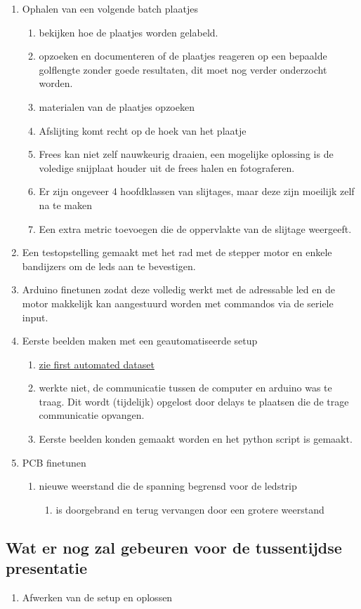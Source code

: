 \documentclass{scrartcl}
\begin{document}
\begin{enumerate}[1]
\item Ophalen van een volgende batch plaatjes
	\begin{enumerate}[a]
	\item bekijken hoe de plaatjes worden gelabeld. 
	\item opzoeken en documenteren of de plaatjes reageren op een bepaalde golflengte zonder goede resultaten, dit moet nog verder onderzocht worden.
	\item materialen van de plaatjes opzoeken
	\item Afslijting komt recht op de hoek van het plaatje
	\item Frees kan niet zelf nauwkeurig draaien, een mogelijke oplossing is de voledige snijplaat houder uit de frees halen en fotograferen.
	\item Er zijn ongeveer 4 hoofdklassen van slijtages, maar deze zijn moeilijk zelf na te maken
	\item Een extra metric toevoegen die de oppervlakte van de slijtage weergeeft. 
	\end{enumerate}
\item Een testopstelling gemaakt met het rad met de stepper motor en enkele bandijzers om de leds aan te bevestigen.
\item Arduino finetunen zodat deze volledig werkt met de adressable led en de motor makkelijk kan aangestuurd worden met commandos via de seriele input.
\item Eerste beelden maken met een geautomatiseerde setup
	\begin{enumerate}[a]
	\item \href{file:///Users/larsdepauw/Documents/Lars.nosync/Documents/School/1Ma%20ing/Masterproef/TWI/code/Vision/Datasets/First_automated/camera_zij_boven_dual_ledstrip/first_test}{zie first automated dataset}
	\item werkte niet, de communicatie tussen de computer en arduino was te traag. Dit wordt (tijdelijk) opgelost door delays te plaatsen die de trage communicatie opvangen. 
	\item Eerste beelden konden gemaakt worden en het python script is gemaakt.
	\end{enumerate}
\item PCB finetunen 
	\begin{enumerate}[a]
	\item nieuwe weerstand die de spanning begrensd voor de ledstrip
		\begin{enumerate}[1]
		\item is doorgebrand en terug vervangen door een grotere weerstand
		\end{enumerate}
	\end{enumerate}
\end{enumerate}




\subsection{Wat er nog zal gebeuren voor de tussentijdse presentatie}

\begin{enumerate}[1]
\item Afwerken van de setup en oplossen 
\end{enumerate}
\end{document}
